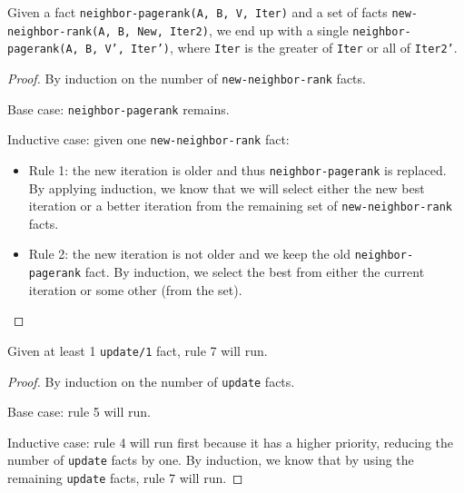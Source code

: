 \begin{lemma}
Given a fact \texttt{neighbor-pagerank(A, B, V, Iter)} and a set of facts
\texttt{new-neighbor-rank(A, B, New, Iter2)}, we end up with a single
\texttt{neighbor-pagerank(A, B, V', Iter')}, where \texttt{Iter} is the greater of
\texttt{Iter} or all of \texttt{Iter2'}.
\end{lemma}
\begin{proof}
By induction on the number of \texttt{new-neighbor-rank} facts.

Base case: \texttt{neighbor-pagerank} remains.

Inductive case: given one \texttt{new-neighbor-rank} fact:

\begin{itemize}
   \item Rule 1: the new iteration is older and thus \texttt{neighbor-pagerank}
   is replaced. By applying induction, we know that we will select either the
   new best iteration or a better iteration from the remaining set of
   \texttt{new-neighbor-rank} facts.
   \item Rule 2: the new iteration is not older and we keep the old
   \texttt{neighbor-pagerank} fact. By induction, we select the best from either
   the current iteration or some other (from the set).
\end{itemize}
\end{proof}

\begin{lemma}
Given at least 1 \texttt{update/1} fact, rule 7 will run.
\end{lemma}
\begin{proof}
By induction on the number of \texttt{update} facts.

Base case: rule 5 will run.

Inductive case: rule 4 will run first because it has a higher priority, reducing
the number of \texttt{update} facts by one. By induction, we know that by
using the remaining \texttt{update} facts, rule 7 will run.
\end{proof}

